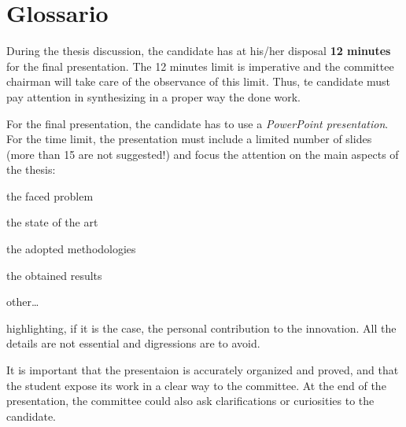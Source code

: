 \section{Glossario}

During the thesis discussion, the candidate has at his/her disposal {\bfseries 12 minutes} for the final presentation. The 12 minutes limit is imperative and the committee chairman will take care of the observance of this limit. Thus, te candidate must pay attention in synthesizing in a proper way the done work.

For the final presentation, the candidate has to use a \emph{PowerPoint presentation}. For the time limit, the presentation must include a limited number of slides (more than 15 are not suggested!) and focus the attention on the main aspects of the thesis:
\begin{compactitem}
\item the faced problem
\item the state of the art
\item the adopted methodologies
\item the obtained results
\item other\dots
\end{compactitem}
highlighting, if it is the case, the personal contribution to the innovation. All the details are not essential and digressions are to avoid.

It is important that the presentaion is accurately organized and proved, and that the student expose its work in a clear way to the committee. At the end of the presentation, the committee could also ask clarifications or curiosities to the candidate.


